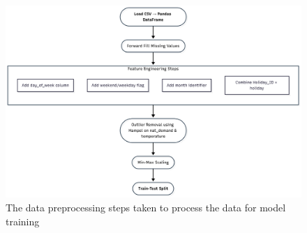 \appendix
\begin{figure}[htbp]
	\centering %
	\includegraphics[scale=0.1]{Chapters/images/preprocess.png}
	\caption{The data preprocessing steps taken to process the data for model training}
	\label{fig:preprocessing_steps_flowchart} %
\end{figure}


